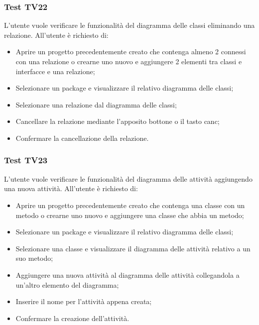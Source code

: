\documentclass[../PianoDiQualifica.tex]{subfiles}
\begin{document}
	\subsubsection{Test TV22} 
	L'utente vuole verificare le funzionalità del diagramma delle classi eliminando una relazione. 
	All'utente è richiesto di: 
	\begin{itemize} 
		\item Aprire un progetto precedentemente creato che contenga almeno 2 connessi con una relazione o crearne uno nuovo e aggiungere 2 elementi tra classi e interfacce e una relazione; 
		\item Selezionare un package e visualizzare il relativo diagramma delle classi; 
		\item Selezionare una relazione dal diagramma delle classi; 
		\item Cancellare la relazione mediante l'apposito bottone o il tasto canc; 
		\item Confermare la cancellazione della relazione. %
	\end{itemize} 
	
	
	
	\subsubsection{Test TV23} 
	L'utente vuole verificare le funzionalità del diagramma delle attività aggiungendo una nuova attività. 
	All'utente è richiesto di: 
	\begin{itemize} 
		\item Aprire un progetto precedentemente creato che contenga una classe con un metodo o crearne uno nuovo e aggiungere una classe che abbia un metodo;
		\item Selezionare un package e visualizzare il relativo diagramma delle classi; 
		\item Selezionare una classe e visualizzare il diagramma delle attività relativo a un suo metodo; %
		\item Aggiungere una nuova attività al diagramma delle attività collegandola a un'altro elemento del diagramma; 
		\item Inserire il nome per l'attività appena creata; %
		\item Confermare la creazione dell'attività. 
	\end{itemize} 
	
\end{document}
